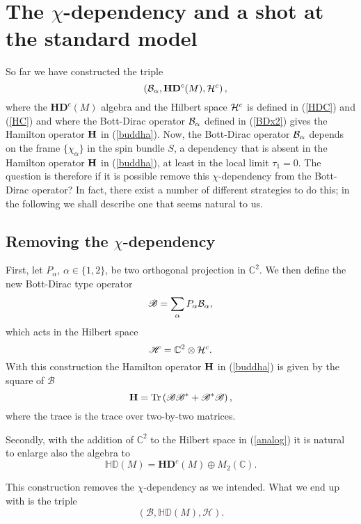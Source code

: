 \documentclass[letterpaper,11pt]{article}
\def\a{\alpha}
\def\cb{{\cal B}}
\def\ch{{\cal H}}
\newcommand{\Tr}{\operatorname{Tr}}
\begin{document}
\section{The $\chi$-dependency and a shot at the standard model}

So far we have constructed the triple
$$
 \quad \left( \cb_\a , \mathbf{HD}^c(M), \ch^c \right),
$$
where the $\mathbf{HD}^c(M)$ algebra and the Hilbert space $\ch^c$ is defined in (\ref{HDC}) and (\ref{HC}) and where the Bott-Dirac operator $\cb_\a$ defined in (\ref{BDx2}) gives the Hamilton operator ${\bf H}$ in (\ref{buddha}). 
Now, the Bott-Dirac operator $\cb_\a$ depends on the frame $\{\chi_\a\}$ in the spin bundle $S$, a dependency that is absent in the Hamilton operator ${\bf H}$ in (\ref{buddha}), at least in the local limit $\tau_1=0$. The question is therefore if it is possible remove this $\chi$-dependency from the Bott-Dirac operator? 
In fact, there exist a number of different strategies to do this; in the following we shall describe one that seems natural to us. 



\subsection{Removing the $\chi$-dependency}



First, let $P_\a$, $\a\in\{1,2\}$, be two orthogonal projection in $\mathbb{C}^2$. We then define the new Bott-Dirac type operator
\begin{equation}
    \mathscr{B} = \sum_\a P_\a \cb_\a,
    \label{hedebolge}
\end{equation}
which acts in the Hilbert space 
\begin{equation}
\mathscr{H} = \mathbb{C}^2  \otimes  \ch^c  .
\label{analog}
\end{equation}
With this construction the Hamilton operator ${\bf H}$ in (\ref{buddha}) is given by the square of $\mathscr{B} $ 
$$
{\bf H} =\Tr \left( \mathscr{B} \mathscr{B}^* + \mathscr{B}^* \mathscr{B} \right),
$$
where the trace is the trace over two-by-two matrices.

Secondly, with the addition of $\mathbb{C}^2$ to the Hilbert space in (\ref{analog}) it is natural to enlarge also the algebra to
$$
 \mathds{HD}(M)= \mathbf{HD}^c(M) \oplus  M_2(\mathbb{C}).
$$

This construction removes the $\chi$-dependency as we intended. What we end up with is the triple
$$
(\mathscr{B} , \mathds{HD}(M),  \mathscr{H}   ).
$$
\end{document}
